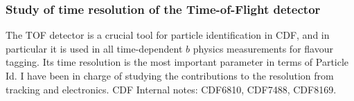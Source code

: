 \documentclass{article}
\newcommand{       \Refereed}[0]{\setboolean{pickrefereed}{true}}
\newcommand{\DisableRefereed}[0]{\setboolean{disablerefereed}{true}}
\newcommand{ \EnableRefereed}[0]{\setboolean{disablerefereed}{false}}
\newcommand{\FlagRefereed}[0]{\setboolean{flagrefereed}{true}}
\newcommand{\DontFlagRefereed}[0]{\setboolean{flagrefereed}{false}}
\newcommand{       \MostRelevant}[0]{\setboolean{pickmostrelevant}{true}}
\newcommand{    \NotMostRelevant}[0]{\setboolean{pickmostrelevant}{false}}
\newcommand{\DisableMostRelevant}[0]{\setboolean{disablemostrelevant}{true}}
\newcommand{ \EnableMostRelevant}[0]{\setboolean{disablemostrelevant}{false}}
\begin{document}
\begin{vita}
\subsubsection*{Study of time resolution of the Time-of-Flight detector}
The TOF detector is a crucial tool for particle identification in CDF, and in particular it is used in all time-dependent $b$ physics measurements for flavour tagging. Its time resolution is the most important parameter in terms of Particle Id. I have been in charge of studying the contributions to the resolution from tracking and electronics. CDF Internal notes: CDF6810, CDF7488, CDF8169.

%
%
%


%


\end{vita}


%

\end{document}
